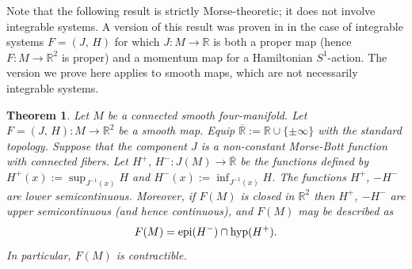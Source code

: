 \documentclass[11pt]{article}
\newtheorem{theorem}{Theorem}[section]
\newcommand{\op}[1]{\!\!\mathop{\rm ~#1}\nolimits}
\newcommand{\RM}{\mathbb{R}}
\begin{document}
Note that the following result is strictly Morse-theoretic; it does
not involve integrable systems. A version of this result was proven in
\cite[Theorem 3.4]{VN2007} in the case of integrable systems
$F=(J,\,H)$ for which $J \colon M \to \mathbb{R}$ is both a proper map
(hence $F\colon M \to \mathbb{R}^2$ is proper) and a momentum map for
a Hamiltonian $S^1$-action. The version we prove here applies to
smooth maps, which are not necessarily integrable systems.

\begin{theorem} \label{imagemomentum:theorem} Let $M$ be a connected
  smooth four-manifold. Let $F=(J,\,H) \colon M \to \mathbb{R}^2$ be a
  smooth map.  Equip $\overline{\RM}:=\mathbb{R}\cup \{\pm\infty\}$
  with the standard topology. Suppose that the component $J$ is a
  non-constant Morse-Bott function with connected fibers.  Let
  $H^{+},\, H^{-} \colon J(M) \to \overline{\RM}$ be the functions
  defined by $H^{+}(x) := \sup_{J^{-1}(x)} H$ and $H^{-}(x) :=
  \inf_{J^{-1}(x)} H$. The functions $H^{+}$, $-H^{-}$ are lower
  semicontinuous. Moreover, if $F(M)$ is closed in $\mathbb{R}^2$ then
  $H^+$, $-H^{-}$ are upper semicontinuous (and hence continuous), and
  $F(M)$ may be described as
  \begin{eqnarray}
    F(M) = \op{epi}(H^{-}) \cap \op{hyp}(H^+). 
    \label{pp}
  \end{eqnarray}
  In particular, $F(M)$ is contractible.
\end{theorem}
\end{document}
